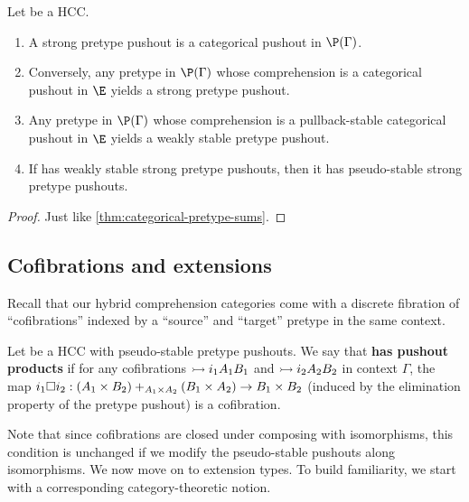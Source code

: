 \documentclass{amsart}
\begin{document}
\begin{lem}\label{thm:categorical-pretype-pushouts}
  Let \E be a HCC.
  \begin{enumerate}
  \item A strong pretype pushout is a categorical pushout in $\P(\Gamma)$.
  \item Conversely, any pretype in $\P(\Gamma)$ whose comprehension is a categorical pushout in $\E$ yields a strong pretype pushout.
  \item Any pretype in $\P(\Gamma)$ whose comprehension is a pullback-stable categorical pushout in $\E$ yields a weakly stable pretype pushout.
  \item If \E has weakly stable strong pretype pushouts, then it has pseudo-stable strong pretype pushouts.
  \end{enumerate}
\end{lem}
\begin{proof}
  Just like \cref{thm:categorical-pretype-sums}.
\end{proof}


\subsection{Cofibrations and extensions}
\label{sec:semantic-cofibrations}

Recall that our hybrid comprehension categories come with a discrete fibration of ``cofibrations'' indexed by a ``source'' and ``target'' pretype in the same context.

\begin{definition}
  Let \E be a HCC with pseudo-stable pretype pushouts.
  We say that \E \textbf{has pushout products} if for any cofibrations $\rightarrowtail{i_1}{A_1}{B_1}$ and $\rightarrowtail{i_2}{A_2}{B_2}$ in context $\Gamma$, the map $i_1\Box i_2 : {(A_1 \times B_2) +_{A_1\times A_2} (B_1 \times A_2)} \to {B_1\times B_2}$ (induced by the elimination property of the pretype pushout) is a cofibration.
\end{definition}

Note that since cofibrations are closed under composing with isomorphisms, this condition is unchanged if we modify the pseudo-stable pushouts along isomorphisms.
We now move on to extension types.
To build familiarity, we start with a corresponding category-theoretic notion.
\end{document}
